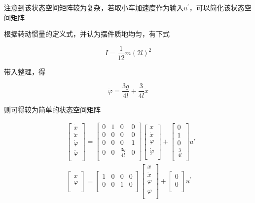 \documentclass{MathorCupmodeling}
\begin{document}
注意到该状态空间矩阵较为复杂，若取小车加速度作为输入$u^{'}$，可以简化该状态空间矩阵

根据转动惯量的定义式，并认为摆件质地均匀，有下式

\begin{equation}
I=\frac{1}{12}m(2l)^2
\end{equation}

带入整理，得

\begin{equation}
\ddot \varphi=\frac{3g}{4l}+\frac{3}{4l}\ddot x
\end{equation}

则可得较为简单的状态空间矩阵

\begin{equation}
\begin{aligned}
&\begin{bmatrix}
\dot x\\
\ddot x\\
\dot{\varphi}\\
\ddot{\varphi}\\
\end{bmatrix}
=
\begin{bmatrix}
0 & 1 & 0 & 0\\
0 & 0 & 0 & 0\\
0 & 0 & 0 & 1\\
0 & 0 & \frac{3g}{4l} & 0\\
\end{bmatrix}
\begin{bmatrix}
x\\
\dot x\\
\varphi\\
\dot{\varphi}\\
\end{bmatrix}
+
\begin{bmatrix}
0\\
1\\
0\\
\frac{3}{4l}\\
\end{bmatrix}
u'\\
&\begin{bmatrix}
x\\
\varphi\\
\end{bmatrix}
=
\begin{bmatrix}
1 &0 &0 &0\\
0 &0 &1 &0\\
\end{bmatrix}
\begin{bmatrix}
x\\
\dot x\\
\varphi\\
\dot{\varphi}\\
\end{bmatrix}
+
\begin{bmatrix}
0\\
0\\
\end{bmatrix}
u^{'}\\
\end{aligned}
\end{equation}
\end{document}
